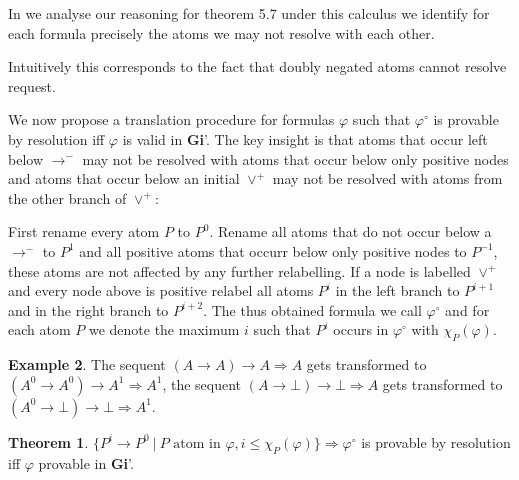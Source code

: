 \documentclass[onehalfspacing]{article}
\theoremstyle{definition}
\newtheorem{theorem}{Theorem}[section]
\theoremstyle{definition}
\theoremstyle{definition}
\theoremstyle{definition}
\theoremstyle{definition}
\theoremstyle{definition}
\newtheorem{example}[theorem]{Example}
\newcommand{\Gi}{\textbf{Gi}\xspace}
\begin{document}
In we analyse our reasoning for theorem 5.7 under this calculus we identify for each formula precisely the atoms we may not resolve with each other.

Intuitively this corresponds to the fact that doubly negated atoms cannot resolve request.

\pagebreak


We now propose a translation procedure for formulas $\varphi$ such that $\varphi^\circ$ is provable by resolution iff $\varphi$ is valid in \Gi'. The key insight is that atoms that occur left below $\to^-$ may not be resolved with atoms that occur below only positive nodes and atoms that occur below an initial $\vee^+$ may not be resolved with atoms from the other branch of $\vee^+$:

First rename every atom $P$ to $P^0$. Rename all atoms that do not occur below a $\to^-$ to $P^1$ and all positive atoms that occurr below only positive nodes to $P^{-1}$, these atoms are not affected by any further relabelling. If a node is labelled $\vee^+$ and every node above is positive relabel all atoms $P^i$ in the left branch to $P^{i+1}$ and in the right branch to $P^{i+2}$. The thus obtained formula we call $\varphi^\circ$ and for each atom $P$ we denote the maximum $i$ such that $P^i$ occurs in $\varphi^\circ$ with $\chi_P(\varphi)$.
\begin{example}The sequent $(A\to A)\to A\Rightarrow A$ gets transformed to $(A^0\to A^0)\to A^1\Rightarrow A^1$, the sequent $(A\to \bot)\to \bot\Rightarrow A$ gets transformed to $(A^0\to \bot)\to\bot\Rightarrow A^1$.
	
\begin{theorem}
	$\{P^i\to P^0\:|\:P \text{ atom in $\varphi$}, i\leq \chi_{P}(\varphi)\}\Rightarrow \varphi^\circ$ is provable by resolution iff $\varphi$ provable in \Gi'.
\end{theorem}
	

	
	
\end{example}





\end{document}
